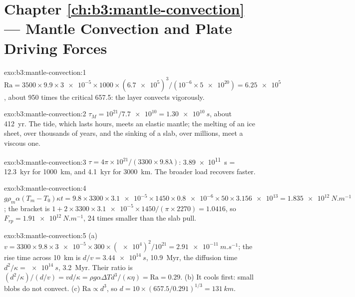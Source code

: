 \section*{Chapter \ref{ch:b3:mantle-convection} --- Mantle Convection and Plate Driving Forces}

\begin{solution}{exo:b3:mantle-convection:1}
$\mathrm{Ra} = 3500\times9.9\times\num{3e-5}\times1000\times(\num{6.7e5})^3/
(10^{-6}\times\num{5e20}) = \num{6.25e5}$, about 950 times the critical
657.5: the layer convects vigorously.
\end{solution}

\begin{solution}{exo:b3:mantle-convection:2}
$\tau_M = 10^{21}/\num{7.7e10} = \qty{1.30e10}{s}$, about \qty{412}{yr}. The
tide, which lasts hours, meets an elastic mantle; the melting of an ice sheet,
over thousands of years, and the sinking of a slab, over millions, meet a
viscous one.
\end{solution}

\begin{solution}{exo:b3:mantle-convection:3}
$\tau = 4\pi\times10^{21}/(3300\times9.8\lambda)$: \qty{3.89e11}{s} =
\qty{12.3}{kyr} for \qty{1000}{km}, and \qty{4.1}{kyr} for \qty{3000}{km}. The
broader load recovers faster.
\end{solution}

\begin{solution}{exo:b3:mantle-convection:4}
$g\rho_m\alpha(T_m - T_0)\kappa t = 9.8\times3300\times\num{3.1e-5}\times1450
\times\num{0.8e-6}\times50\times\num{3.156e13} = \qty{1.835e12}{N.m^{-1}}$; the
bracket is $1 + 2\times3300\times\num{3.1e-5}\times1450/(\pi\times2270) = 1.0416$,
so $F_{rp} = \qty{1.91e12}{N.m^{-1}}$, 24 times smaller than the slab pull.
\end{solution}

\begin{solution}{exo:b3:mantle-convection:5}
(a) $v = 3300\times9.8\times\num{3e-5}\times300\times(\num{e4})^2/10^{21} =
\qty{2.91e-11}{m.s^{-1}}$; the rise time across \qty{10}{km} is $d/v =
\qty{3.44e14}{s}$, \qty{10.9}{Myr}, the diffusion time $d^2/\kappa =
\qty{e14}{s}$, \qty{3.2}{Myr}. Their ratio is $(d^2/\kappa)/(d/v) =
vd/\kappa = \rho g\alpha\Delta Td^3/(\kappa\eta) = \mathrm{Ra} = 0.29$. (b) It
cools first: small blobs do not convect. (c) $\mathrm{Ra} \propto d^3$, so $d =
10\times(657.5/0.291)^{1/3} = \qty{131}{km}$.
\end{solution}

